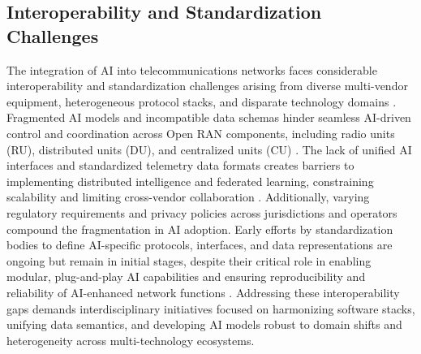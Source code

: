 \documentclass[sigconf]{acmart}
\begin{document}
\subsection{Interoperability and Standardization Challenges}

The integration of AI into telecommunications networks faces considerable interoperability and standardization challenges arising from diverse multi-vendor equipment, heterogeneous protocol stacks, and disparate technology domains \cite{ref48,ref52,ref54}. Fragmented AI models and incompatible data schemas hinder seamless AI-driven control and coordination across Open RAN components, including radio units (RU), distributed units (DU), and centralized units (CU) \cite{ref48}. The lack of unified AI interfaces and standardized telemetry data formats creates barriers to implementing distributed intelligence and federated learning, constraining scalability and limiting cross-vendor collaboration \cite{ref52}. Additionally, varying regulatory requirements and privacy policies across jurisdictions and operators compound the fragmentation in AI adoption. Early efforts by standardization bodies to define AI-specific protocols, interfaces, and data representations are ongoing but remain in initial stages, despite their critical role in enabling modular, plug-and-play AI capabilities and ensuring reproducibility and reliability of AI-enhanced network functions \cite{ref54}. Addressing these interoperability gaps demands interdisciplinary initiatives focused on harmonizing software stacks, unifying data semantics, and developing AI models robust to domain shifts and heterogeneity across multi-technology ecosystems.
\end{document}
